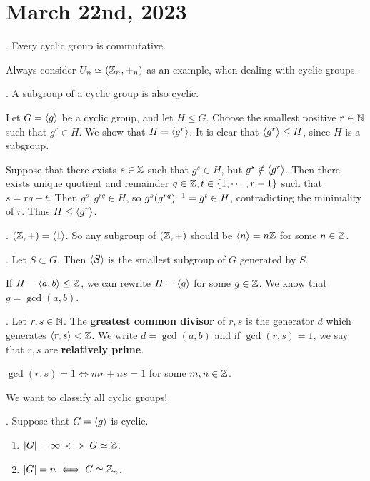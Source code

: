 \section*{March 22nd, 2023}


\thm. Every cyclic group is commutative.

Always consider \(U_n \simeq (\mathbb{Z}_n, +_n)\) as an example, when dealing with cyclic groups.

\thm. A subgroup of a cyclic group is also cyclic.

\pf Let \(G = \left\langle g \right\rangle\) be a cyclic group, and let \(H \leq G\). Choose the smallest positive \(r \in \mathbb{N}\) such that \(g^r \in H\). We show that \(H = \left\langle g^r \right\rangle\). It is clear that \(\left\langle g^r \right\rangle \leq H\), since \(H\) is a subgroup.

Suppose that there exists \(s \in \mathbb{Z}\) such that \(g^s \in H\), but \(g^s \notin \left\langle g^r \right\rangle\). Then there exists unique quotient and remainder \(q \in \mathbb{Z}, t \in \{1, \cdots, r - 1\}\) such that \(s = rq + t\). Then \(g^s, g^{rq} \in H\), so \(g^s(g^{rq})^{-1} = g^t \in H\), contradicting the minimality of \(r\). Thus \(H \leq \left\langle g^r \right\rangle\).

\ex. \((\mathbb{Z}, +) = \left\langle 1 \right\rangle\). So any subgroup of \((\mathbb{Z}, +)\) should be \(\left\langle n \right\rangle = n\mathbb{Z}\) for some \(n \in \mathbb{Z}\).

. Let \(S \subset G\). Then \(\left\langle S \right\rangle\) is the smallest subgroup of \(G\) generated by \(S\).

If \(H = \left\langle a, b \right\rangle \leq \mathbb{Z}\), we can rewrite \(H = \left\langle g \right\rangle\) for some \(g \in \mathbb{Z}\). We know that \(g = \gcd(a, b)\).

.  Let \(r, s \in \mathbb{N}\). The \textbf{greatest common divisor} of \(r, s\) is the generator \(d\) which generates \(\left\langle r, s \right\rangle < \mathbb{Z}\). We write \(d = \gcd(a, b)\) and if \(\gcd(r, s) = 1\), we say that \(r, s\) are \textbf{relatively prime}.

\rmk \(\gcd(r, s) = 1 \iff mr + ns = 1\) for some \(m, n \in \mathbb{Z}\).

We want to classify all cyclic groups!

\thm.  Suppose that \(G = \left\langle g \right\rangle\) is cyclic.
\begin{enumerate}
    \item \(\left| G \right| = \infty \iff G \simeq \mathbb{Z}\).
    \item \(\left| G \right| = n \iff G \simeq \mathbb{Z}_n\).
\end{enumerate}


